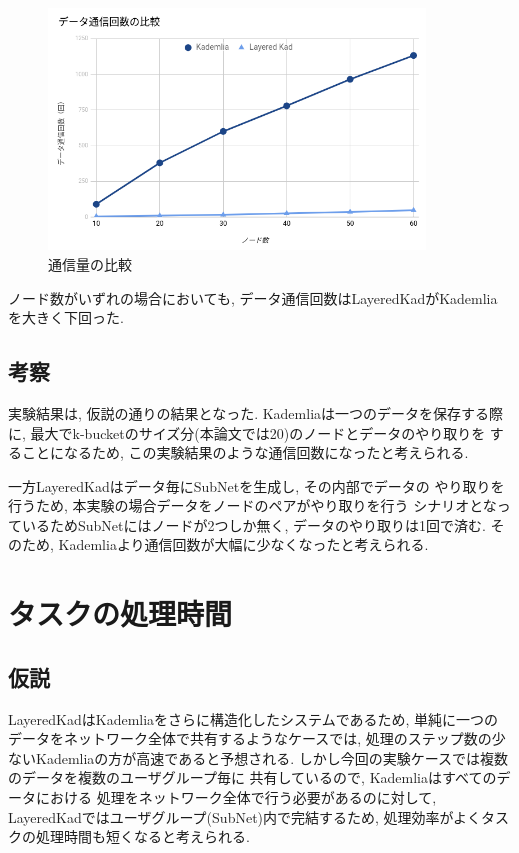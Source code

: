 \documentclass[sotsuron]{jcsie}
\begin{document}
\begin{figure}[H]	
	\centering
	\includegraphics[width=10cm]{./assets/image/traffic_graph.png}
	\caption{通信量の比較}
	\label{figure:traffic-3}
\end{figure}

ノード数がいずれの場合においても, データ通信回数はLayeredKadがKademlia
を大きく下回った.

\subsection{考察}
実験結果は, 仮説の通りの結果となった.
Kademliaは一つのデータを保存する際に, 
最大でk-bucketのサイズ分(本論文では20)のノードとデータのやり取りを
することになるため, この実験結果のような通信回数になったと考えられる.

一方LayeredKadはデータ毎にSubNetを生成し, その内部でデータの
やり取りを行うため, 本実験の場合データをノードのペアがやり取りを行う
シナリオとなっているためSubNetにはノードが2つしか無く, 
データのやり取りは1回で済む.
そのため, Kademliaより通信回数が大幅に少なくなったと考えられる.

\section{タスクの処理時間}
\subsection{仮説}
LayeredKadはKademliaをさらに構造化したシステムであるため, 
単純に一つのデータをネットワーク全体で共有するようなケースでは, 
処理のステップ数の少ないKademliaの方が高速であると予想される.
しかし今回の実験ケースでは複数のデータを複数のユーザグループ毎に
共有しているので, Kademliaはすべてのデータにおける
処理をネットワーク全体で行う必要があるのに対して, 
LayeredKadではユーザグループ(SubNet)内で完結するため, 
処理効率がよくタスクの処理時間も短くなると考えられる.
\end{document}
